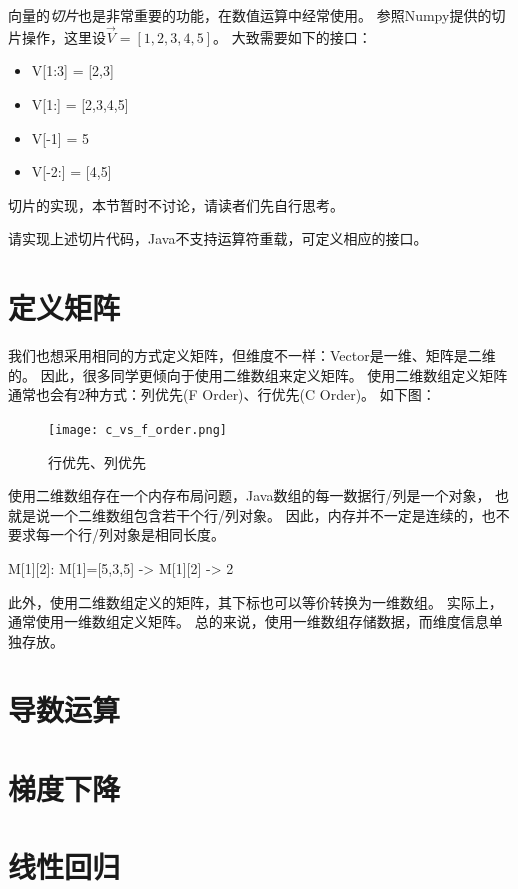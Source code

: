 {}
\vspace{1em}

\noindent
向量的\emph{切片}也是非常重要的功能，在数值运算中经常使用。
参照Numpy提供的切片操作，这里设$\vec{V}=[1,2,3,4,5]$。
大致需要如下的接口：

\begin{itemize}
\item V[1:3] = [2,3]
\item V[1:]  = [2,3,4,5]
\item V[-1]  = 5
\item V[-2:] = [4,5]
\end{itemize}

\noindent
切片的实现，本节暂时不讨论，请读者们先自行思考。

\bigskip
\begin{exercise}
	请实现上述切片代码，Java不支持运算符重载，可定义相应的接口。
\end{exercise}


\section{定义矩阵}
我们也想采用相同的方式定义矩阵，但维度不一样：Vector是一维、矩阵是二维的。
因此，很多同学更倾向于使用二维数组来定义矩阵。
使用二维数组定义矩阵通常也会有2种方式：列优先(F Order)、行优先(C Order)。
如下图：

\begin{figure}[!htb]
    \caption{行优先、列优先}
    \centerline{\texttt{[image: c\_vs\_f\_order.png]}}
\end{figure}

\noindent
使用二维数组存在一个内存布局问题，Java数组的每一数据行/列是一个对象，
也就是说一个二维数组包含若干个行/列对象。
因此，内存并不一定是连续的，也不要求每一个行/列对象是相同长度。

\medskip
\centerline{
    M[1][2]: M[1]=[5,3,5] -> M[1][2] -> 2
}
\medskip

\noindent
此外，使用二维数组定义的矩阵，其下标也可以等价转换为一维数组。
实际上，通常使用一维数组定义矩阵。
总的来说，使用一维数组存储数据，而维度信息单独存放。

\section{导数运算}

\section{梯度下降}

\section{线性回归}
